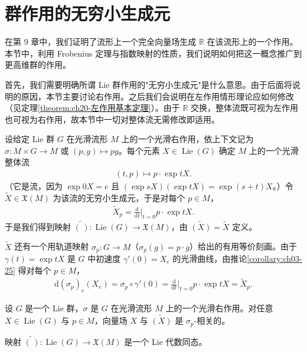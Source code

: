 \documentclass[../../main.tex]{subfiles}
\begin{document}
\section{群作用的无穷小生成元}\label{section:ch20-infinitesimal-generator}

在第 9 章中，我们证明了流形上一个完全向量场生成 $\mathbb{R}$ 在该流形上的一个作用。本节中，利用 Frobenius 定理与指数映射的性质，我们说明如何把这一概念推广到更高维群的作用。

首先，我们需要明确所谓 Lie 群作用的"无穷小生成元"是什么意思。由于后面将说明的原因，本节主要讨论右作用。之后我们会说明在左作用情形理论应如何修改（见定理\cref{theorem:ch20-左作用基本定理}）。由于 $\mathbb{R}$ 交换，整体流既可视为左作用也可视为右作用，故本节中一切对整体流无需修改即适用。

设给定 Lie 群 $G$ 在光滑流形 $M$ 上的一个光滑右作用，依上下文记为 $\sigma\colon M\times G\to M$ 或 $(p,g)\mapsto pg$。每个元素 $X\in\operatorname{Lie}(G)$ 确定 $M$ 上的一个光滑整体流
\begin{align*}
(t,p)\mapsto p\cdot\exp tX.
\end{align*}
（它是流，因为 $\exp 0X=e$ 且 $(\exp sX)(\exp tX)=\exp(s+t)X$。）令 $\widetilde X\in\mathfrak X(M)$ 为该流的无穷小生成元，于是对每个 $p\in M$，
\begin{align}
\widetilde X_p=\frac{\mathrm{d}}{\mathrm{d}t}\bigg|_{t=0}p\cdot\exp tX.
\end{align}
于是我们得到映射 $\widetilde{(\,)}\colon\operatorname{Lie}(G)\to\mathfrak X(M)$，由 $\widetilde{(X)}=\widetilde X$ 定义。

$\widetilde X$ 还有一个用轨道映射 $\sigma_p\colon G\to M$（$\sigma_p(g)=p\cdot g$）给出的有用等价刻画。由于 $\gamma(t)=\exp tX$ 是 $G$ 中初速度 $\gamma'(0)=X_e$ 的光滑曲线，由推论\cref{corollary:ch03-25} 得对每个 $p\in M$，
\begin{align}
\mathrm{d}(\sigma_p)_e(X_e)=\sigma_p\circ\gamma'(0)=\frac{\mathrm{d}}{\mathrm{d}t}\bigg|_{t=0}p\cdot\exp tX=\widetilde X_p.
\end{align}

\begin{lemma}\label{lemma:ch20-轨道映射相关}
设 $G$ 是一个 Lie 群，$\sigma$ 是 $G$ 在光滑流形 $M$ 上的一个光滑右作用。对任意 $X\in\operatorname{Lie}(G)$ 与 $p\in M$，向量场 $X$ 与 $\widetilde{(X)}$ 是 $\sigma_p$-相关的。
\end{lemma}

\begin{proposition}\label{proposition:ch20-生成元是同态}
映射 $\widetilde{(\,)}\colon\operatorname{Lie}(G)\to\mathfrak X(M)$ 是一个 Lie 代数同态。
\end{proposition}
\end{document}
